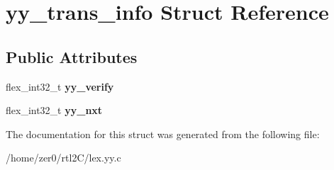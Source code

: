 \hypertarget{structyy__trans__info}{}\section{yy\+\_\+trans\+\_\+info Struct Reference}
\label{structyy__trans__info}
\subsection*{Public Attributes}
\begin{DoxyCompactItemize}
\item 
\mbox{\label{structyy__trans__info_a5c9f61e770deef50bd4e697310342fe9}} 
flex\+\_\+int32\+\_\+t {\bfseries yy\+\_\+verify}
\item 
\mbox{\label{structyy__trans__info_ae0715250c2bef261e596e77e0030f13e}} 
flex\+\_\+int32\+\_\+t {\bfseries yy\+\_\+nxt}
\end{DoxyCompactItemize}


The documentation for this struct was generated from the following file\+:\begin{DoxyCompactItemize}
\item 
/home/zer0/rtl2\+C/lex.\+yy.\+c\end{DoxyCompactItemize}
